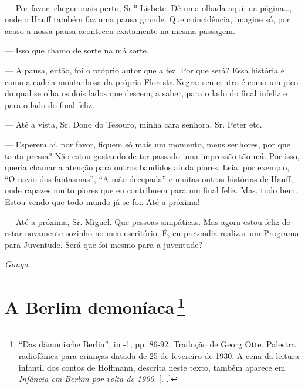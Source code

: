 \begin{myparindent}{0pt}
\begin{Parskip}
 --- Por favor, chegue mais perto, Sr.\textsuperscript{a} Lisbete.
Dê uma olhada aqui, na página\ldots{}, onde o Hauff também faz uma pausa
grande. Que coincidência, imagine só, por acaso a nossa pausa aconteceu
exatamente na mesma passagem.

 --- Isso que chamo de sorte na má sorte.

 --- A pausa, então, foi o próprio autor que a fez. Por que será?
Essa história é como a cadeia montanhosa da própria Floresta Negra: seu
centro é como um pico do qual se olha os dois lados que descem, a saber,
para o lado do final infeliz e para o lado do final feliz.

 --- Até a vista, Sr. Dono do Tesouro, minha cara
senhora, Sr. Peter etc.

 --- Esperem aí, por favor, fiquem só mais um momento,
meus senhores, por que tanta pressa? Não estou gostando de ter passado
uma impressão tão má. Por isso, queria chamar a atenção para outros
bandidos ainda piores. Leia, por exemplo, ``O navio dos fantasmas'', ``A
mão decepada'' e muitas outras histórias de Hauff, onde rapazes muito
piores que eu contribuem para um final feliz. Mas, tudo bem. Estou vendo
que todo mundo já se foi. Até a próxima!

 --- Até a próxima, Sr. Miguel. Que pessoas simpáticas. Mas agora
estou feliz de estar novamente sozinho no meu escritório. É, eu
pretendia realizar um Programa para Juventude. Será que foi mesmo para a
juventude?

\emph{Gongo.}
\end{Parskip}
\end{myparindent}

\chapter{A Berlim demoníaca\,\footnote[*]{``Das dämonische Berlin'',
  in  -1, pp. 86-92. Tradução de Georg Otte. Palestra radiofônica
  para crianças datada de 25 de fevereiro de 1930. A cena da leitura
  infantil dos contos de  Hoffmann, descrita neste texto, também
  aparece em \emph{Infância em Berlim por volta de 1900}. [. .]} }

